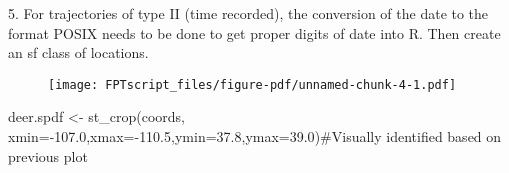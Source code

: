 \documentclass[
  letterpaper,
]{book}
\newenvironment{Shaded}{\begin{snugshade}}{\end{snugshade}}
\newcommand{\AttributeTok}[1]{\textcolor[rgb]{0.40,0.45,0.13}{#1}}
\newcommand{\CommentTok}[1]{\textcolor[rgb]{0.37,0.37,0.37}{#1}}
\newcommand{\DecValTok}[1]{\textcolor[rgb]{0.68,0.00,0.00}{#1}}
\newcommand{\FloatTok}[1]{\textcolor[rgb]{0.68,0.00,0.00}{#1}}
\newcommand{\FunctionTok}[1]{\textcolor[rgb]{0.28,0.35,0.67}{#1}}
\newcommand{\NormalTok}[1]{\textcolor[rgb]{0.00,0.23,0.31}{#1}}
\newcommand{\OtherTok}[1]{\textcolor[rgb]{0.00,0.23,0.31}{#1}}
\newcommand{\SpecialCharTok}[1]{\textcolor[rgb]{0.37,0.37,0.37}{#1}}
\newcommand{\StringTok}[1]{\textcolor[rgb]{0.13,0.47,0.30}{#1}}
\begin{document}
5. For trajectories of type II (time recorded), the conversion of the
date to the format POSIX needs to be done to get proper digits of date
into R. Then create an sf class of locations.

\begin{Shaded}
\end{Shaded}

\begin{figure}[H]

{\centering \texttt{[image: FPTscript\_files/figure-pdf/unnamed-chunk-4-1.pdf]}

}

\end{figure}

\begin{Shaded}
\begin{Highlighting}[]
\NormalTok{deer.spdf }\OtherTok{\textless{}{-}} \FunctionTok{st\_crop}\NormalTok{(coords, }\AttributeTok{xmin=}\SpecialCharTok{{-}}\FloatTok{107.0}\NormalTok{,}\AttributeTok{xmax=}\SpecialCharTok{{-}}\FloatTok{110.5}\NormalTok{,}\AttributeTok{ymin=}\FloatTok{37.8}\NormalTok{,}\AttributeTok{ymax=}\FloatTok{39.0}\NormalTok{)}\CommentTok{\#Visually identified based on previous plot}
\end{Highlighting}
\end{Shaded}
\end{document}
